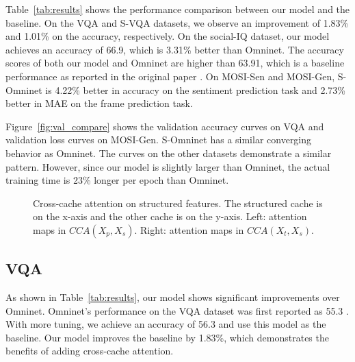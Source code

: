 \documentclass{article}
\begin{document}
Table~\ref{tab:results} shows the performance comparison between our model and the baseline. On the VQA and S-VQA datasets, we observe an improvement of 1.83\% and 1.01\% on the accuracy, respectively. On the social-IQ dataset, our model achieves an accuracy of 66.9, which is 3.31\% better than Omninet. The accuracy scores of both our model and Omninet are higher than 63.91, which is a baseline performance as reported in the original paper \cite{zadeh2019social}. On MOSI-Sen and MOSI-Gen, S-Omninet is 4.22\% better in accuracy on the sentiment prediction task and 2.73\% better in MAE on the frame prediction task.

Figure~\ref{fig:val_compare} shows the validation accuracy curves on VQA and validation loss curves on MOSI-Gen. S-Omninet has a similar converging behavior as Omninet. The curves on the other datasets demonstrate a similar pattern. However, since our model is slightly larger than Omninet, the actual training time is 23\% longer per epoch than Omninet.

\begin{figure}
    \centering
    


    \caption{Cross-cache attention on structured features. The structured cache is on the x-axis and the other cache is on the y-axis. Left: attention maps in $CCA(X_{p}, X_{s})$. Right: attention maps in $CCA(X_{t}, X_{s})$.}
    \label{fig:svqa_attn}
\end{figure}

\subsection{VQA}\label{sec:results-vqa}

As shown in Table~\ref{tab:results}, our model shows significant improvements over Omninet. Omninet's performance on the VQA dataset was first reported as 55.3 \cite{pramanik2019omninet}. With more tuning, we achieve an accuracy of 56.3 and use this model as the baseline. Our model improves the baseline by 1.83\%, which demonstrates the benefits of adding cross-cache attention. 
\end{document}
